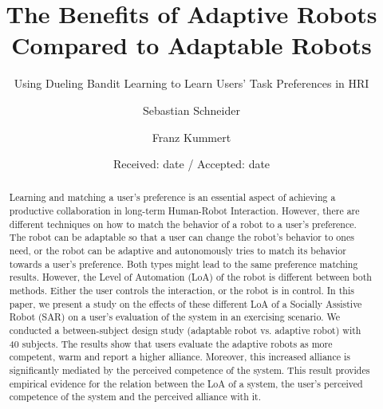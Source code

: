 \title{The Benefits of Adaptive Robots Compared to Adaptable Robots%
}
\subtitle{Using Dueling Bandit Learning to Learn Users' Task Preferences in HRI}


\author{Sebastian Schneider         \and
        Franz Kummert %
}



\date{Received: date / Accepted: date}


\maketitle

\begin{abstract}
  Learning and matching a user's preference is an essential aspect of achieving a productive collaboration in long-term Human-Robot Interaction. However, there are different techniques on how to match the behavior of a robot to a user's preference. The robot can be adaptable so that a user can change the robot's behavior to ones need, or the robot can be adaptive and autonomously tries to match its behavior towards a user's preference. Both types might lead to the same preference matching results. However, the Level of Automation (LoA) of the robot is different between both methods. Either the user controls the interaction, or the robot is in control. In this paper, we present a study on the effects of these different LoA of a Socially Assistive Robot (SAR) on a user's evaluation of the system in an exercising scenario. We conducted a between-subject design study (adaptable robot vs. adaptive robot) with 40 subjects. The results show that users evaluate the adaptive robots as more competent, warm and report a higher alliance. Moreover, this increased alliance is significantly mediated by the perceived competence of the system. This result provides empirical evidence for the relation between the LoA of a system, the user's perceived competence of the system and the perceived alliance with it.
\end{abstract}

